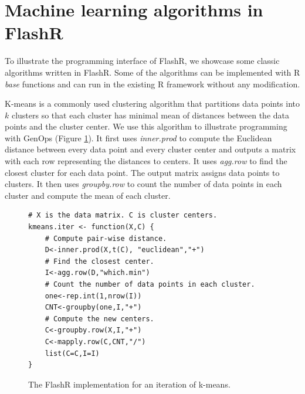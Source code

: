 \section{Machine learning algorithms in FlashR} \label{sec:apps}
To illustrate the programming interface of FlashR, we showcase some classic
algorithms written in FlashR.
Some of the algorithms can be implemented with R \textit{base} functions and
can run in the existing R framework without any modification.

K-means is a commonly used clustering algorithm that partitions data points
into $k$ clusters so that each cluster has minimal mean of distances between
the data points and the cluster center. We use this algorithm
to illustrate programming with GenOps (Figure \ref{fig:kmeans}).
It first uses \textit{inner.prod} to
compute the Euclidean distance between every data point and every cluster center
and outputs a matrix with each row representing the distances to centers.  
It uses \textit{agg.row} to find the closest
cluster for each data point.  The output matrix 
assigns data points to clusters. It then uses \textit{groupby.row} to count
the number of data points in each cluster and compute the mean of each cluster.

\begin{figure}
\centering
	\footnotesize
	\begin{verbatim}
# X is the data matrix. C is cluster centers.
kmeans.iter <- function(X,C) {
	# Compute pair-wise distance.
	D<-inner.prod(X,t(C), "euclidean","+")
	# Find the closest center.
	I<-agg.row(D,"which.min")
	# Count the number of data points in each cluster.
	one<-rep.int(1,nrow(I))
	CNT<-groupby(one,I,"+")
	# Compute the new centers.
	C<-groupby.row(X,I,"+")
	C<-mapply.row(C,CNT,"/")
	list(C=C,I=I)
}
	\end{verbatim}
	\caption{The FlashR implementation for an iteration of k-means.}
	\label{fig:kmeans}
\end{figure}

